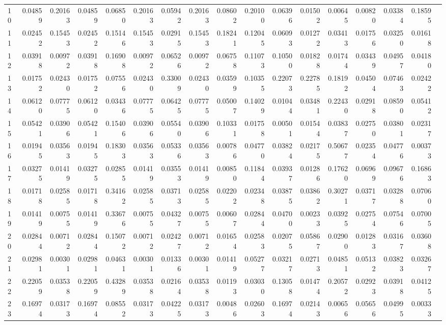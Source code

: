 \documentclass{article}
\begin{document}
\begin{landscape}
\begin{table}[htbp]
\begin{tabular}{lrrrrrrrrrrrrrrrr}
10 & 0.04859 & 0.20163 & 0.04859 & 0.06850 & 0.20163 & 0.05942 & 0.20163 & 0.08602 & 0.20100 & 0.06396 & 0.01502 & 0.00645 & 0.00820 & 0.03384 & 0.18595 \\
11 & 0.02452 & 0.15453 & 0.02452 & 0.15146 & 0.15453 & 0.02915 & 0.15453 & 0.18241 & 0.12045 & 0.06093 & 0.01272 & 0.03413 & 0.01756 & 0.03250 & 0.01618 \\
12 & 0.03918 & 0.00972 & 0.03918 & 0.16908 & 0.00972 & 0.06526 & 0.00972 & 0.06758 & 0.11073 & 0.10500 & 0.01828 & 0.01744 & 0.03439 & 0.04957 & 0.04180 \\
13 & 0.01752 & 0.02430 & 0.01752 & 0.07556 & 0.02430 & 0.33009 & 0.02430 & 0.03599 & 0.10355 & 0.22073 & 0.22785 & 0.18192 & 0.04504 & 0.07463 & 0.02422 \\
14 & 0.06120 & 0.07775 & 0.06120 & 0.03436 & 0.07775 & 0.06425 & 0.07775 & 0.05007 & 0.14029 & 0.01044 & 0.03481 & 0.22430 & 0.02918 & 0.08590 & 0.05412 \\
15 & 0.05421 & 0.03906 & 0.05421 & 0.15406 & 0.03906 & 0.05540 & 0.03906 & 0.10331 & 0.01758 & 0.00501 & 0.01544 & 0.03837 & 0.02750 & 0.03801 & 0.02317 \\
16 & 0.01945 & 0.03563 & 0.01945 & 0.18303 & 0.03563 & 0.05336 & 0.03563 & 0.00786 & 0.04770 & 0.03824 & 0.02175 & 0.50677 & 0.02354 & 0.04776 & 0.00373 \\
17 & 0.03275 & 0.01419 & 0.03275 & 0.02855 & 0.01419 & 0.03553 & 0.01419 & 0.00850 & 0.11844 & 0.03937 & 0.01286 & 0.17620 & 0.06969 & 0.09676 & 0.16863 \\
18 & 0.01718 & 0.02585 & 0.01718 & 0.34162 & 0.02585 & 0.03713 & 0.02585 & 0.02202 & 0.02348 & 0.03875 & 0.03862 & 0.30271 & 0.03717 & 0.03288 & 0.07060 \\
19 & 0.01419 & 0.00755 & 0.01419 & 0.33676 & 0.00755 & 0.04327 & 0.00755 & 0.00607 & 0.02844 & 0.04700 & 0.00233 & 0.03925 & 0.02754 & 0.07546 & 0.07005 \\
20 & 0.02844 & 0.00712 & 0.02844 & 0.15072 & 0.00712 & 0.02427 & 0.00712 & 0.01654 & 0.02583 & 0.02075 & 0.05867 & 0.02900 & 0.01283 & 0.03167 & 0.03608 \\
21 & 0.02981 & 0.00301 & 0.02981 & 0.04631 & 0.00301 & 0.01336 & 0.00301 & 0.01419 & 0.05277 & 0.03217 & 0.02713 & 0.04851 & 0.05132 & 0.03823 & 0.03267 \\
22 & 0.22059 & 0.03538 & 0.22059 & 0.43289 & 0.03538 & 0.02164 & 0.03538 & 0.01193 & 0.03030 & 0.13058 & 0.01474 & 0.20572 & 0.02923 & 0.03918 & 0.04125 \\
23 & 0.16974 & 0.03173 & 0.16974 & 0.08552 & 0.03173 & 0.04225 & 0.03173 & 0.00486 & 0.02603 & 0.16974 & 0.02143 & 0.00656 & 0.05656 & 0.04995 & 0.00333 \\

\end{tabular}
\end{table}
\end{landscape}
\end{document}
